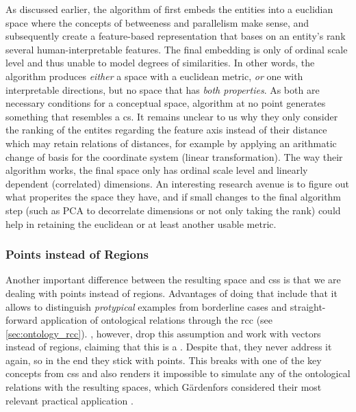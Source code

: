 As discussed earlier, the algorithm of \textcite{Derrac2015} first embeds the entities into a euclidian space where the concepts of betweeness and parallelism make sense, and subsequently create a feature-based representation that bases on an entity's rank \wrt several human-interpretable features. The final embedding is only of ordinal scale level and thus unable to model  degrees of similarities. In other words, the algorithm produces \textit{either} a space with a euclidean metric, \textit{or} one with interpretable directions, but no space that has \textit{both properties}. As both are necessary conditions for a conceptual space,  algorithm at no point generates something that resembles a \gls{cs}. It remains unclear to us why they only consider the ranking of the entites regarding the feature axis instead of their distance which may retain relations of distances, for example by applying an arithmatic change of basis for the coordinate system (linear transformation). The way their algorithm works, the final space only has ordinal scale level and linearly dependent (correlated) dimensions. An interesting research avenue is to figure out what properites the space they have, and if small changes to the final algorithm step (such as PCA to decorrelate dimensions or not only taking the rank) could help in retaining the euclidean or at least another usable metric.

\subsubsection*{Points instead of Regions}

Another important difference between the resulting space and \glspl{cs} is that we are dealing with points instead of regions. Advantages of doing that include that it allows to distinguish \textit{protypical} examples from borderline cases \cite{Gardenfors2000a} and straight-forward application of ontological relations through the \gls{rcc} (see \autoref{sec:ontology_rcc}). \textcite{Derrac2015}, however, drop this assumption and work with vectors instead of regions, claiming that this is a  \cite[8]{Derrac2015}. Despite that, they never address it again, so in the end they stick with points. This breaks with one of the key concepts from \glspl{cs} and also renders it impossible to simulate any of the ontological relations with the resulting spaces, which Gärdenfors considered their most relevant practical application \cite{Gardenfors2004}. 

